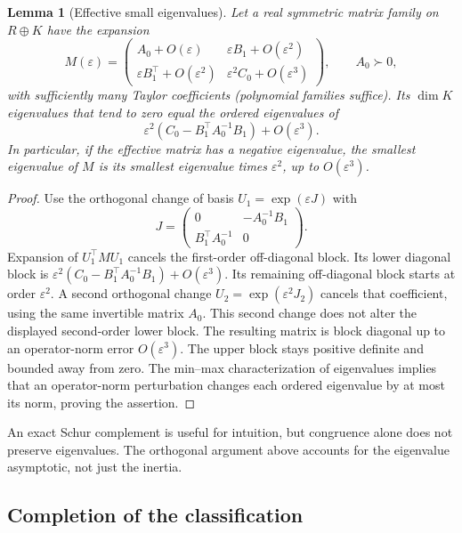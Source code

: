 \documentclass[11pt,letterpaper]{article}
\numberwithin{equation}{section}
\newtheorem{lemma}[theorem]{Lemma}
\theoremstyle{definition}
\begin{document}
\begin{lemma}[Effective small eigenvalues]\label{lem:perturb}
Let a real symmetric matrix family on $R\oplus K$ have the expansion
\[
 M(\varepsilon)=
 \begin{pmatrix}
 A_0+O(\varepsilon)&\varepsilon B_1+O(\varepsilon^2)\\
 \varepsilon B_1^\top+O(\varepsilon^2)&\varepsilon^2 C_0+O(\varepsilon^3)
 \end{pmatrix},\qquad A_0\succ0,
\]
with sufficiently many Taylor coefficients (polynomial families suffice). Its $\dim K$ eigenvalues that tend to zero equal the ordered eigenvalues of
\[
 \varepsilon^2(C_0-B_1^\top A_0^{-1}B_1)+O(\varepsilon^3).
\]
In particular, if the effective matrix has a negative eigenvalue, the smallest eigenvalue of $M$ is its smallest eigenvalue times $\varepsilon^2$, up to $O(\varepsilon^3)$.
\end{lemma}
\begin{proof}
Use the orthogonal change of basis $U_1=\exp(\varepsilon J)$ with
\[
 J=\begin{pmatrix}0&-A_0^{-1}B_1\\B_1^\top A_0^{-1}&0\end{pmatrix}.
\]
Expansion of $U_1^\top M U_1$ cancels the first-order off-diagonal block. Its lower diagonal block is
$\varepsilon^2(C_0-B_1^\top A_0^{-1}B_1)+O(\varepsilon^3)$.
Its remaining off-diagonal block starts at order $\varepsilon^2$. A second orthogonal change $U_2=\exp(\varepsilon^2J_2)$ cancels that coefficient, using the same invertible matrix $A_0$. This second change does not alter the displayed second-order lower block. The resulting matrix is block diagonal up to an operator-norm error $O(\varepsilon^3)$. The upper block stays positive definite and bounded away from zero. The min--max characterization of eigenvalues implies that an operator-norm perturbation changes each ordered eigenvalue by at most its norm, proving the assertion.
\end{proof}

An exact Schur complement is useful for intuition, but congruence alone does not preserve eigenvalues. The orthogonal argument above accounts for the eigenvalue asymptotic, not just the inertia.

\subsection{Completion of the classification}
\end{document}
